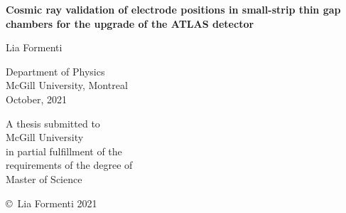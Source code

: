 \pagestyle{empty}

\begin{titlepage}
        \begin{center}
        \vspace*{1.0cm}

        \Huge
        {\bf Cosmic ray validation of electrode positions in small-strip thin gap chambers for the upgrade of the ATLAS detector } \\

        \vspace*{1.0cm}

        \Large
        Lia Formenti \\
        
        \vspace*{1.0cm}
        
        \normalsize
        Department of Physics \\
        McGill University, Montreal \\
        October, 2021 \\

        \vspace*{3.0cm}

        \normalsize
        A thesis submitted to\\
        McGill University \\ 
        in partial fulfillment of the \\
        requirements of the degree of \\
        Master of Science \\

        \vspace*{2.0cm}

        \copyright\ Lia Formenti 2021 \\
        \end{center}
\end{titlepage}

\pagestyle{plain}
\setcounter{page}{2}

\cleardoublepage %

